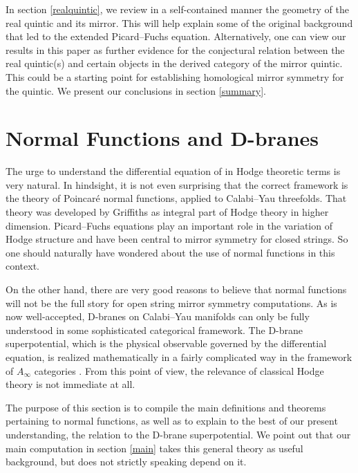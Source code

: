 In section \ref{realquintic}, we review in a self-contained manner the 
geometry of the real quintic and its mirror. This will help explain
some of the original background that led to the extended Picard--Fuchs 
equation. Alternatively, one can view our results in 
this paper as further evidence for the conjectural relation between 
the real quintic(s) and certain objects in the derived category of the
mirror quintic. This could be a starting point for establishing 
homological mirror symmetry for the quintic. We present our 
conclusions in section \ref{summary}.




\section{Normal Functions and D-branes}
\label{theory}

The urge to understand the differential equation of \cite{open} in
Hodge theoretic terms is very natural. In hindsight, it is not even
surprising that the correct framework is the theory of Poincar\'e
normal functions, applied to Calabi--Yau threefolds. That theory was 
developed by Griffiths \cite{griffiths1,griffithsdiff} as integral 
part of Hodge theory in higher dimension. Picard--Fuchs equations 
play an important role in the variation of Hodge structure and have 
been central to mirror symmetry for closed strings. So one should 
naturally have wondered about the use of normal functions in this 
context.

On the other hand, there are very good reasons to believe that 
normal functions will not be the full story for open string 
mirror symmetry computations. As is now well-accepted, D-branes
on Calabi--Yau manifolds can only be fully understood in some
sophisticated categorical framework. The D-brane superpotential,
which is the physical observable governed by the differential
equation, is realized mathematically in a fairly complicated 
way in the framework of $A_\infty$ categories \cite{lazaroiu,tomasiello}.
From this point of view, the relevance of classical Hodge theory is
not immediate at all.

The purpose of this section is to compile the main definitions and
theorems pertaining to normal functions, as well as to explain to the
best of our present understanding, the relation to the D-brane 
superpotential. We point out that our main computation in section 
\ref{main} takes this general theory as useful background, but 
does not strictly speaking depend on it.


